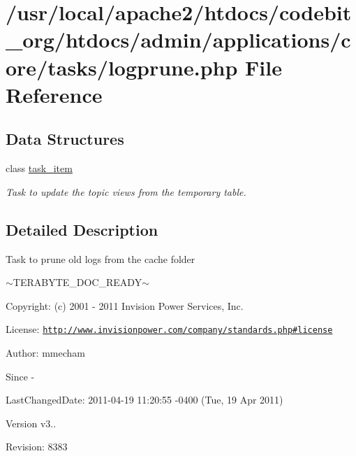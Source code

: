 \hypertarget{logprune_8php}{\section{/usr/local/apache2/htdocs/codebit\-\_\-org/htdocs/admin/applications/core/tasks/logprune.php File Reference}
\label{logprune_8php}
}
\subsection*{Data Structures}
\begin{DoxyCompactItemize}
\item 
class \hyperlink{classtask__item}{task\-\_\-item}
\begin{DoxyCompactList}\small\item\em Task to update the topic views from the temporary table. \end{DoxyCompactList}\end{DoxyCompactItemize}


\subsection{Detailed Description}
\begin{DoxyVerb}  Task to prune old logs from the cache folder
\end{DoxyVerb}
 $\sim$\-T\-E\-R\-A\-B\-Y\-T\-E\-\_\-\-D\-O\-C\-\_\-\-R\-E\-A\-D\-Y$\sim$ \begin{DoxyParagraph}{Copyright\-:}
(c) 2001 -\/ 2011 Invision Power Services, Inc.
\end{DoxyParagraph}
\begin{DoxyParagraph}{License\-:}
\href{http://www.invisionpower.com/company/standards.php#license}{\tt http\-://www.\-invisionpower.\-com/company/standards.\-php\#license}
\end{DoxyParagraph}
\begin{DoxyParagraph}{Author\-:}
mmecham 
\end{DoxyParagraph}
\begin{DoxySince}{Since}
-\/ 
\end{DoxySince}
\begin{DoxyParagraph}{Last\-Changed\-Date\-:}
2011-\/04-\/19 11\-:20\-:55 -\/0400 (Tue, 19 Apr 2011) 
\end{DoxyParagraph}
\begin{DoxyVersion}{Version}
v3.. 
\end{DoxyVersion}
\begin{DoxyParagraph}{Revision\-:}
8383 
\end{DoxyParagraph}
